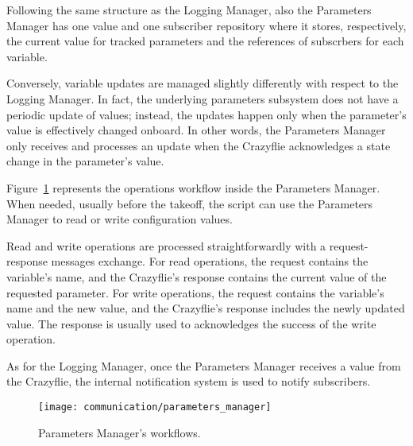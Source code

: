 Following the same structure as the Logging Manager, also the Parameters Manager has one value and one subscriber repository where it stores, respectively, the current value for tracked parameters and the references of subscrbers for each variable.

Conversely, variable updates are managed slightly differently with respect to the Logging Manager. 
In fact, the underlying parameters subsystem does not have a periodic update of values; instead, the updates happen only when the parameter's value is effectively changed onboard.
In other words, the Parameters Manager only receives and processes an update when the Crazyflie acknowledges a state change in the parameter's value.
 
Figure~\ref{fig:parameters_manager} represents the operations workflow inside the Parameters Manager. When needed, usually before the takeoff,
the script can use the Parameters Manager to read or write configuration values. 

Read and write operations are processed straightforwardly with a request-response messages exchange.
For read operations, the request contains the variable's name, and the Crazyflie's response contains the current value of the requested parameter.
For write operations, the request contains the variable's name and the new value, and the Crazyflie's response includes the newly updated value. 
The response is usually used to acknowledges the success of the write operation.

As for the Logging Manager, once the Parameters Manager receives a value from the Crazyflie, the internal notification system is used to notify subscribers.

\begin{figure}[tb]
    \centering
    \texttt{[image: communication/parameters\_manager]}
    \caption{Parameters Manager's workflows.}\label{fig:parameters_manager}
\end{figure}

